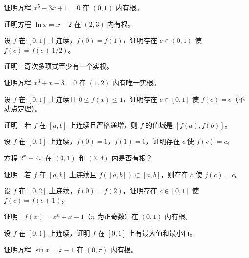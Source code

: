 \begin{exercise}[2]
证明方程 \(x^5 - 3x + 1 = 0\) 在 \((0,1)\) 内有根。
\end{exercise}
\begin{exercise}[2]
证明方程 \(\ln x = x - 2\) 在 \((2,3)\) 内有根。
\end{exercise}
\begin{exercise}[2]
设 \(f\) 在 \([0,1]\) 上连续，\(f(0)=f(1)\)，证明存在 \(c\in(0,1)\) 使 \(f(c)=f(c+1/2)\)。
\end{exercise}
\begin{exercise}[2]
证明：奇次多项式至少有一个实根。
\end{exercise}

\begin{exercise}[3]
证明方程 \(x^3 + x - 3 = 0\) 在 \((1,2)\) 内有唯一实根。
\end{exercise}
\begin{exercise}[3]
设 \(f\) 在 \([0,1]\) 上连续且 \(0\le f(x)\le 1\)，证明存在 \(c\in[0,1]\) 使 \(f(c)=c\)（不动点定理）。
\end{exercise}
\begin{exercise}[3]
证明：若 \(f\) 在 \([a,b]\) 上连续且严格递增，则 \(f\) 的值域是 \([f(a),f(b)]\)。
\end{exercise}
\begin{exercise}[3]
设 \(f\) 在 \([0,1]\) 上连续，\(f(0)=1\)，\(f(1)=0\)，证明存在 \(c\) 使 \(f(c)=c\)。
\end{exercise}
\begin{exercise}[3]
方程 \(2^x = 4x\) 在 \((0,1)\) 和 \((3,4)\) 内是否有根？
\end{exercise}

\begin{exercise}[4]
证明：若 \(f\) 在 \([a,b]\) 上连续且 \(f([a,b])\subset[a,b]\)，则存在 \(c\) 使 \(f(c)=c\)。
\end{exercise}
\begin{exercise}[4]
设 \(f\) 在 \([0,2]\) 上连续，\(f(0)=f(2)\)，证明存在 \(c\in[0,1]\) 使 \(f(c)=f(c+1)\)。
\end{exercise}
\begin{exercise}[4]
证明：\(f(x)=x^n + x - 1\)（\(n\) 为正奇数）在 \((0,1)\) 内有根。
\end{exercise}
\begin{exercise}[4]
设 \(f\) 在 \([0,1]\) 上连续，证明 \(f\) 在 \([0,1]\) 上有最大值和最小值。
\end{exercise}
\begin{exercise}[4]
证明方程 \(\sin x = x-1\) 在 \((0,\pi)\) 内有根。
\end{exercise}


